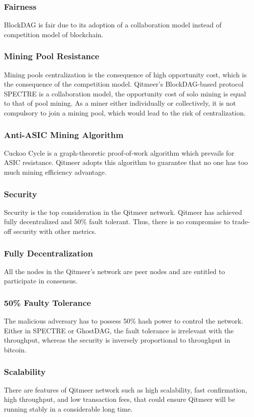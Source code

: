 \documentclass[a4paper,11pt]{article}
\begin{document}
\subsubsection{Fairness}
BlockDAG is fair due to its adoption of a collaboration model instead of competition model of blockchain.
\subsubsection*{Mining Pool Resistance}
Mining pools centralization is the consequence of high opportunity cost, which is the consequence of the competition model. Qitmeer’s BlockDAG-based protocol SPECTRE is a collaboration model, the opportunity cost of solo mining is equal to that of pool mining. As a miner either individually or collectively, it is not compulsory to join a mining pool, which would lead to the risk of centralization.
\subsubsection*{Anti-ASIC Mining Algorithm}
Cuckoo Cycle is a graph-theoretic proof-of-work algorithm which prevails for ASIC resistance. Qitmeer adopts this algorithm to guarantee that no one has too much mining efficiency advantage.
\subsubsection{Security}
Security is the top consideration in the Qitmeer network. Qitmeer has achieved fully decentralized and 50\% fault tolerant. Thus, there is no compromise to trade-off security with other metrics.
\subsubsection*{Fully Decentralization}
All the nodes in the Qitmeer’s network are peer nodes and are entitled to participate in consensus.
\subsubsection*{50\% Faulty Tolerance}
The malicious adversary has to possess 50\% hash power to control the network. Either in SPECTRE or GhostDAG, the fault tolerance is irrelevant with the throughput, whereas the security is inversely proportional to throughput in bitcoin.

\subsubsection{Scalability}
There are features of Qitmeer network such as high scalability, fast confirmation, high throughput, and low transaction fees, that could ensure Qitmeer will be running stably in a considerable long time.
\end{document}
